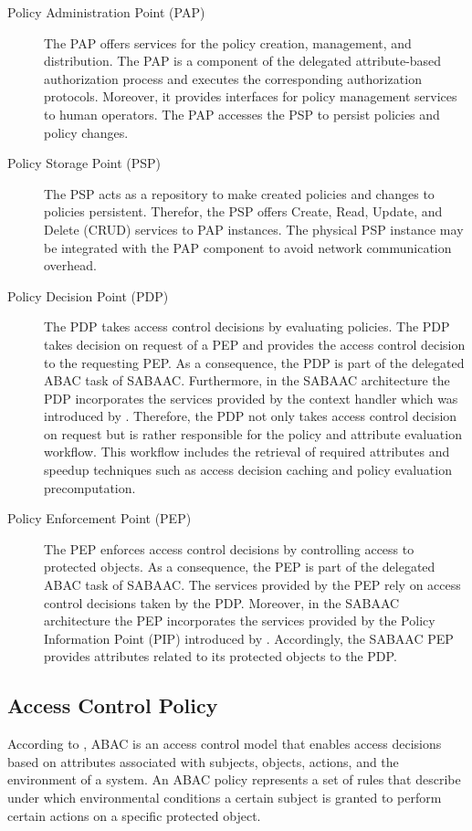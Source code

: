 \begin{description}
    \item[Policy Administration Point (PAP)] The PAP offers services for the policy creation, management, and distribution.
    The PAP is a component of the delegated attribute-based authorization process and executes the corresponding authorization protocols.
    Moreover, it provides interfaces for policy management services to human operators.
    The PAP accesses the PSP to persist policies and policy changes.
    \item[Policy Storage Point (PSP)] The PSP acts as a repository to make created policies and changes to policies persistent.
    Therefor, the PSP offers Create, Read, Update, and Delete (CRUD) services to PAP instances.
    The physical PSP instance may be integrated with the PAP component to avoid network communication overhead.
    \item[Policy Decision Point (PDP)] The PDP takes access control decisions by evaluating policies.
    The PDP takes decision on request of a PEP and provides the access control decision to the requesting PEP.
    As a consequence, the PDP is part of the delegated ABAC task of SABAAC.
    Furthermore, in the SABAAC architecture the PDP incorporates the services provided by the context handler which was introduced by \citeauthor{Hu2014} \cite{Hu2014}.
    Therefore, the PDP not only takes access control decision on request but is rather responsible for the policy and attribute evaluation workflow.
    This workflow includes the retrieval of required attributes and speedup techniques such as access decision caching and policy evaluation precomputation.
    \item[Policy Enforcement Point (PEP)] The PEP enforces access control decisions by controlling access to protected objects.
    As a consequence, the PEP is part of the delegated ABAC task of SABAAC.
    The services provided by the PEP rely on access control decisions taken by the PDP.
    Moreover, in the SABAAC architecture the PEP incorporates the services provided by the Policy Information Point (PIP) introduced by \citeauthor{Hu2014} \cite{Hu2014}.
    Accordingly, the SABAAC PEP provides attributes related to its protected objects to the PDP.
\end{description}

\subsection{Access Control Policy}
\label{sec:approach:sabaac:policy}
According to \citeauthor{Hu2014} \cite{Hu2014}, ABAC is an access control model that enables access decisions based on attributes associated with subjects, objects, actions, and the environment of a system.
An ABAC policy represents a set of rules that describe under which environmental conditions a certain subject is granted to perform certain actions on a specific protected object.

